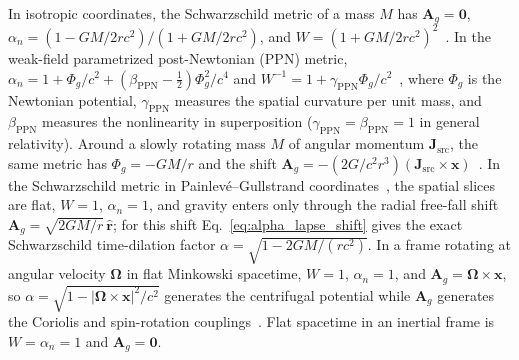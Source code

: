 \documentclass[aps,prd,onecolumn,tightenlines,nofootinbib,notitlepage,11pt,floatfix]{revtex4-2}
\theoremstyle{indentedtheorem}
\begin{document}
In isotropic coordinates, the Schwarzschild metric of a mass $M$ has $\mathbf{A}_g=\mathbf{0}$, $\alpha_n=(1-GM/2rc^2)/(1+GM/2rc^2)$, and $W=(1+GM/2rc^2)^2$~\citep{Baumgarte2003Numerical}. In the weak-field parametrized post-Newtonian (PPN) metric, $\alpha_n = 1 + \Phi_g/c^2 + (\beta_\text{PPN}-\tfrac{1}{2})\Phi_g^2/c^4$ and $W^{-1} = 1 + \gamma_\text{PPN}\Phi_g/c^2$~\citep{Will2014Confrontation}, where $\Phi_g$ is the Newtonian potential, $\gamma_\text{PPN}$ measures the spatial curvature per unit mass, and $\beta_\text{PPN}$ measures the nonlinearity in superposition ($\gamma_\text{PPN}=\beta_\text{PPN}=1$ in general relativity). Around a slowly rotating mass $M$ of angular momentum $\mathbf{J}_\text{src}$, the same metric has $\Phi_g=-GM/r$ and the shift $\mathbf{A}_g = -(2G/c^2r^3)(\mathbf{J}_\text{src}\times\mathbf{x})$~\citep{Lense1918FrameDragging,MTW1973Gravitation}. In the Schwarzschild metric in Painlev\'e--Gullstrand coordinates~\citep{Painleve1921Mecanique,MartelPoisson2001Regular}, the spatial slices are flat, $W=1$, $\alpha_n=1$, and gravity enters only through the radial free-fall shift $\mathbf{A}_g = \sqrt{2GM/r}\,\hat{\mathbf{r}}$; for this shift Eq.~\eqref{eq:alpha_lapse_shift} gives the exact Schwarzschild time-dilation factor $\alpha = \sqrt{1-2GM/(rc^2)}$. In a frame rotating at angular velocity $\boldsymbol{\Omega}$ in flat Minkowski spacetime, $W=1$, $\alpha_n=1$, and $\mathbf{A}_g = \boldsymbol{\Omega}\times\mathbf{x}$, so $\alpha = \sqrt{1-|\boldsymbol{\Omega}\times\mathbf{x}|^2/c^2}$ generates the centrifugal potential while $\mathbf{A}_g$ generates the Coriolis and spin-rotation couplings~\citep{HehlNi1990Inertial}. Flat spacetime in an inertial frame is $W=\alpha_n=1$ and $\mathbf{A}_g=\mathbf{0}$.
\end{document}
